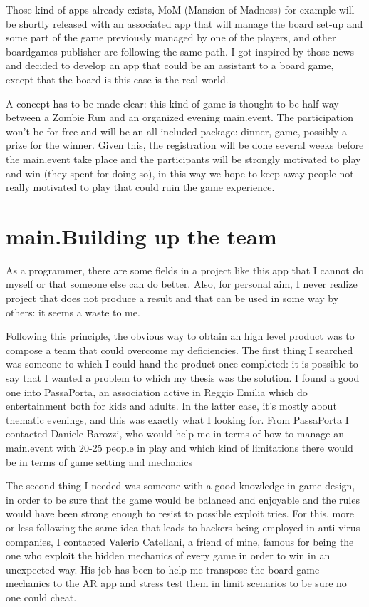 		Those kind of apps already exists, MoM (Mansion of Madness) for example will be shortly released with an associated app that will manage the board set-up and some part of the game previously managed by one of the players, and other boardgames publisher are following the same path.
		I got inspired by those news and decided to develop an app that could be an assistant to a board game, except that the board is this case is the real world.
		
		A concept has to be made clear: this kind of game is thought to be half-way between a Zombie Run and an organized evening main.event.
		The participation won't be for free and will be an all included package: dinner, game, possibly a prize for the winner.
		Given this, the registration will be done several weeks before the main.event take place and the participants will be strongly motivated to play and win (they spent for doing so), in this way we hope to keep away people not really motivated to play that could ruin the game experience.
	
	\section{main.Building up the team}
		
		As a programmer, there are some fields in a project like this app that I cannot do myself or that someone else can do better.
		Also, for personal aim, I never realize project that does not produce a result and that can be used in some way by others: it seems a waste to me.
		
		Following this principle, the obvious way to obtain an high level product was to compose a team that could overcome my deficiencies.
		The first thing I searched was someone to which I could hand the product once completed: it is possible to say that I wanted a problem to which my thesis was the solution.
		I found a good one into PassaPorta, an association active in Reggio Emilia which do entertainment both for kids and adults.
		In the latter case, it's mostly about thematic evenings, and this was exactly what I looking for.
		From PassaPorta I contacted Daniele Barozzi, who would help me in terms of how to manage an main.event with 20-25 people in play and which kind of limitations there would be in terms of game setting and mechanics
		
		The second thing I needed was someone with a good knowledge in game design, in order to be sure that the game would be balanced and enjoyable and the rules would have been strong enough to resist to possible exploit tries.
		For this, more or less following the same idea that leads to hackers being employed in anti-virus companies, I contacted Valerio Catellani, a friend of mine, famous for being the one who exploit the hidden mechanics of every game in order to win in an unexpected way. His job has been to help me transpose the board game mechanics to the AR app and stress test them in limit scenarios to be sure no one could cheat.
		
